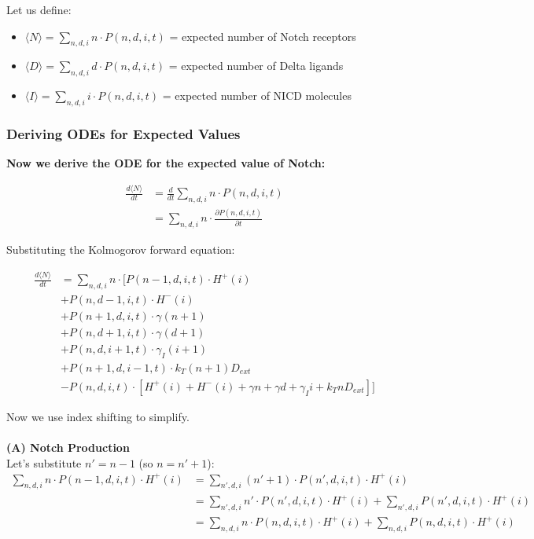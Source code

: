 \documentclass{article}
\begin{document}
\begin{flushleft}
Let us define:
\begin{itemize}
  \item $\langle N \rangle = \sum_{n,d,i} n \cdot P(n,d,i,t)$ = expected number of Notch receptors
  \item $\langle D \rangle = \sum_{n,d,i} d \cdot P(n,d,i,t)$ = expected number of Delta ligands
  \item $\langle I \rangle = \sum_{n,d,i} i \cdot P(n,d,i,t)$ = expected number of NICD molecules
\end{itemize}
\subsubsection{Deriving ODEs for Expected Values}

\textbf{Now we derive the ODE for the expected value of Notch:}

\begin{align*}
\frac{d\langle N \rangle}{dt} &= \frac{d}{dt}\sum_{n,d,i} n \cdot P(n,d,i,t) \\
&= \sum_{n,d,i} n \cdot \frac{\partial P(n,d,i,t)}{\partial t}
\end{align*}

Substituting the Kolmogorov forward equation:

\begin{align*}
\frac{d\langle N \rangle}{dt} &= \sum_{n,d,i} n \cdot \Big[ P(n-1,d,i,t) \cdot H^+(i) \\
&+ P(n,d-1,i,t) \cdot H^-(i) \\
&+ P(n+1,d,i,t) \cdot \gamma(n+1) \\
&+ P(n,d+1,i,t) \cdot \gamma(d+1) \\
&+ P(n,d,i+1,t) \cdot \gamma_I(i+1) \\
&+ P(n+1,d,i-1,t) \cdot k_T(n+1)D_{ext} \\
&- P(n,d,i,t) \cdot [H^+(i) + H^-(i) + \gamma n + \gamma d + \gamma_I i + k_T n D_{ext}] \Big]
\end{align*}

Now we use index shifting to simplify.\\~\\

\textbf{(A) Notch Production} \\
Let's substitute $n' = n-1$ (so $n = n'+1$):
\begin{align*}
\sum_{n,d,i} n \cdot P(n-1,d,i,t) \cdot H^+(i) &= \sum_{n',d,i} (n'+1) \cdot P(n',d,i,t) \cdot H^+(i) \\
&= \sum_{n',d,i} n' \cdot P(n',d,i,t) \cdot H^+(i) + \sum_{n',d,i} P(n',d,i,t) \cdot H^+(i) \\
&= \sum_{n,d,i} n \cdot P(n,d,i,t) \cdot H^+(i) + \sum_{n,d,i} P(n,d,i,t) \cdot H^+(i) \\
\end{align*}


\end{flushleft}
\end{document}
